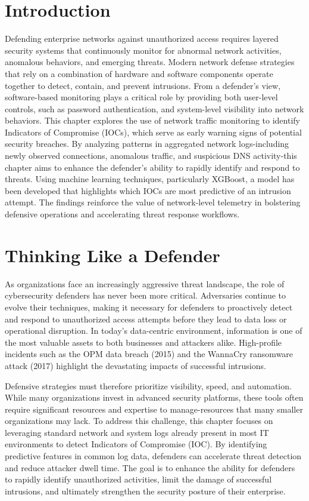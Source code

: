 \section{Introduction}
Defending enterprise networks against unauthorized access requires layered security systems that continuously monitor for abnormal network activities, anomalous behaviors, and emerging threats. Modern network defense strategies that rely on a combination of hardware and software components operate together to detect, contain, and prevent intrusions. From a defender's view, software-based monitoring plays a critical role by providing both user-level controls, such as password authentication, and system-level visibility into network behaviors. This chapter explores the use of network traffic monitoring to identify Indicators of Compromise (IOCs), which serve as early warning signs of potential security breaches. By analyzing patterns in aggregated network logs-including newly observed connections, anomalous traffic, and suspicious DNS activity-this chapter aims to enhance the defender's ability to rapidly identify and respond to threats. Using machine learning techniques, particularly XGBoost, a model has been developed that highlights which IOCs are most predictive of an intrusion attempt. The findings reinforce the value of network-level telemetry in bolstering defensive operations and accelerating threat response workflows.

\section{Thinking Like a Defender}

As organizations face an increasingly aggressive threat landscape, the role of cybersecurity defenders has never been more critical. Adversaries continue to evolve their techniques, making it necessary for defenders to proactively detect and respond to unauthorized access attempts before they lead to data loss or operational disruption. In today's data-centric environment, information is one of the most valuable assets to both businesses and attackers alike. High-profile incidents such as the OPM data breach (2015) and the WannaCry ransomware attack (2017) highlight the devastating impacts of successful intrusions.

Defensive strategies must therefore prioritize visibility, speed, and automation. While many organizations invest in advanced security platforms, these tools often require significant resources and expertise to manage-resources that many smaller organizations may lack. To address this challenge, this chapter focuses on leveraging standard network and system logs already present in most IT environments to detect Indicators of Compromise (IOC). By identifying predictive features in common log data, defenders can accelerate threat detection and reduce attacker dwell time. The goal is to enhance the ability for defenders to rapidly identify unauthorized activities, limit the damage of successful intrusions, and ultimately strengthen the security posture of their enterprise.

